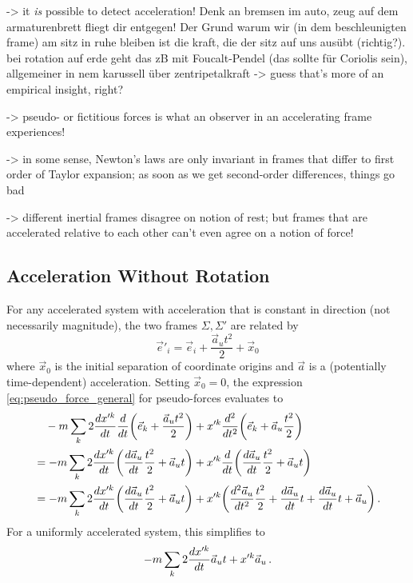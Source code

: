 \documentclass[../class_mech_main.tex]{subfiles}
\begin{document}
-> it \emph{is} possible to detect acceleration! Denk an bremsen im auto, zeug auf dem armaturenbrett fliegt dir entgegen! Der Grund warum wir (in dem beschleunigten frame) am sitz in ruhe bleiben ist die kraft, die der sitz auf uns ausübt (richtig?). bei rotation auf erde geht das zB mit Foucalt-Pendel (das sollte für Coriolis sein), allgemeiner in nem karussell über zentripetalkraft -> guess that's more of an empirical insight, right?


-> pseudo- or fictitious forces is what an observer in an accelerating frame experiences!


-> in some sense, Newton's laws are only invariant in frames that differ to first order of Taylor expansion; as soon as we get second-order differences, things go bad

-> different inertial frames disagree on notion of rest; but frames that are accelerated relative to each other can't even agree on a notion of force!





		\subsection{Acceleration Without Rotation}
For any accelerated system with acceleration that is constant in direction (not necessarily magnitude), the two frames $\Sigma, \Sigma'$ are related by
\begin{equation}
	\vec{e}'_i = \vec{e}_i + \frac{\vec{a}_u t^2}{2} + \vec{x}_0
\end{equation}
where $\vec{x}_0$ is the initial separation of coordinate origins and $\vec{a}$ is a (potentially time-dependent) acceleration. Setting $\vec{x}_0 = 0$, the expression \eqref{eq:pseudo_force_general} for pseudo-forces evaluates to
\begin{align}
	&\quad - m \sum_k 2 \dv{x'^k}{t} \dv{t} \qty(\vec{e}_k + \frac{\vec{a}_u t^2}{2}) + x'^k \dv[2]{t} \qty(\vec{e}_k + \vec{a}_u \frac{t^2}{2})
	\notag\\
	&= - m \sum_k 2 \dv{x'^k}{t} \qty(\dv{\vec{a}_u}{t} \frac{t^2}{2} + \vec{a}_u t) + x'^k \dv{t} \qty(\dv{\vec{a}_u}{t} \frac{t^2}{2} + \vec{a}_u t)
	\notag\\
	&= - m \sum_k 2 \dv{x'^k}{t} \qty(\dv{\vec{a}_u}{t} \frac{t^2}{2} + \vec{a}_u t) + x'^k \qty(\dv[2]{\vec{a}_u}{t} \frac{t^2}{2} + \dv{\vec{a}_u}{t} t + \dv{\vec{a}_u}{t} t + \vec{a}_u) \, .
\end{align}
For a uniformly accelerated system, this simplifies to
\begin{equation}
	- m \sum_k 2 \dv{x'^k}{t} \vec{a}_u t + x'^k \vec{a}_u \, .
\end{equation}
\end{document}
